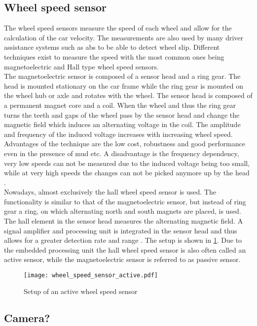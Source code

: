 \subsection{Wheel speed sensor}
The wheel speed sensors measure the speed of each wheel and allow for the calculation of the car velocity.
The measurements are also used by many driver assistance systems such as \gls{abs} to be able to detect wheel slip.
Different techniques exist to measure the speed with the most common ones being magnetoelectric and Hall type wheel speed sensors.\\
The magnetoelectric sensor is composed of a sensor head and a ring gear.
The head is mounted stationary on the car frame while the ring gear is mounted on the wheel hub or axle and rotates with the wheel.
The sensor head is composed of a permanent magnet core and a coil.
When the wheel and thus the ring gear turns the teeth and gaps of the wheel pass by the sensor head and change the magnetic field which induces an alternating voltage in the coil.
The amplitude and frequency of the induced voltage increases with increasing wheel speed.
Advantages of the technique are the low cost, robustness and good performance even in the presence of mud etc.
A disadvantage is the frequency dependency, very low speeds can not be measured due to the induced voltage being too small, while at very high speeds the changes can not be picked anymore up by the head \cite{AutoReif2014}.\\
Nowadays, almost exclusively the hall wheel speed sensor is used.
The functionality is similar to that of the magnetoelectric sensor, but instead of ring gear a ring, on which alternating north and south magnets are placed, is used.
The hall element in the sensor head measures the alternating magnetic field.
A signal amplifier and processing unit is integrated in the sensor head and thus allows for a greater detection rate and range \cite{Re2011}.
The setup is shown in \cref{fig:wheel_speed_sensor_active}.
Due to the embedded processing unit the hall wheel speed sensor is also often called an active sensor, while the magnetoelectric sensor is referred to as passive sensor.
\begin{figure}[htbp]
	\centering
	\texttt{[image: wheel\_speed\_sensor\_active.pdf]}
	\caption{Setup of an active wheel speed sensor \cite{Re2011}}
	\label{fig:wheel_speed_sensor_active}
\end{figure}


\subsection{Camera?}



